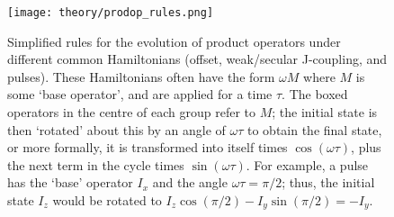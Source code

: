 \begin{figure}[htbp]
    \centering
    \texttt{[image: theory/prodop\_rules.png]}%
    \caption[Simplified rules for product operator evolutions]{
        Simplified rules for the evolution of product operators under different common Hamiltonians (offset, weak/secular J-coupling, and pulses).
        These Hamiltonians often have the form $\omega M$ where $M$ is some `base operator', and are applied for a time $\tau$.
        The boxed operators in the centre of each group refer to $M$; the initial state is then `rotated' about this by an angle of $\omega\tau$ to obtain the final state, or more formally, it is transformed into itself times $\cos(\omega\tau)$, plus the next term in the cycle times $\sin(\omega\tau)$.
        For example, a  pulse has the `base' operator $I_x$ and the angle $\omega\tau = \pi/2$; thus, the initial state $I_z$ would be rotated to $I_z\cos(\pi/2) - I_y\sin(\pi/2) = -I_y$.
    }
    \label{fig:prodop_rules}
\end{figure}

